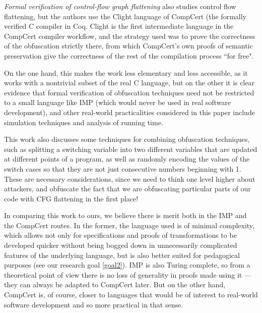 \documentclass[compsoc,conference,a4paper,10pt,times]{IEEEtran}
\begin{document}
\par \emph{Formal verification of control-flow graph flattening} \cite{Blazy2} also studies control flow flattening, but the authors use the Clight language of CompCert \cite{CompCert}(the formally verified C compiler in Coq.
Clight is the first intermediate language in the CompCert compiler workflow, and the strategy used was to prove the correctness of the obfuscation strictly there, from which CompCert's own proofs of semantic preservation give the correctness of the rest of the compilation process ``for free".
\par On the one hand, this makes the work less elementary and less accessible, as it works with a nontrivial subset of the real C language, but on the other it is clear evidence that formal verification of obfuscation techniques need not be restricted to a small language like IMP (which would never be used in real software development), and other real-world practicalities considered in this paper include simulation techniques and analysis of running time.
\par This work also discusses some techniques for combining obfuscation techniques, such as splitting a switching variable into two different variables that are updated at different points of a program, as well as randomly encoding the values of the switch cases so that they are not just consecutive numbers beginning with 1.  These are necessary considerations, since we need to think one level higher about attackers, and obfuscate the fact that we are obfuscating particular parts of our code with CFG flattening in the first place!
\par In comparing this work to ours, we believe there is merit both in the IMP and the CompCert routes.  In the former, the language used is of minimal complexity, which allows not only for specifications and proofs of transformations to be developed quicker without being bogged down in unnecessarily complicated features of the underlying language, but is also better suited for pedagogical purposes (see our research goal \ref{goal2}). IMP is also Turing complete, so from a theoretical point of view there is no loss of generality in proofs made using it --- they can always be adapted to CompCert later.  But on the other hand, CompCert is, of course, closer to languages that would be of interest to real-world software development and so more practical in that sense.
\end{document}
